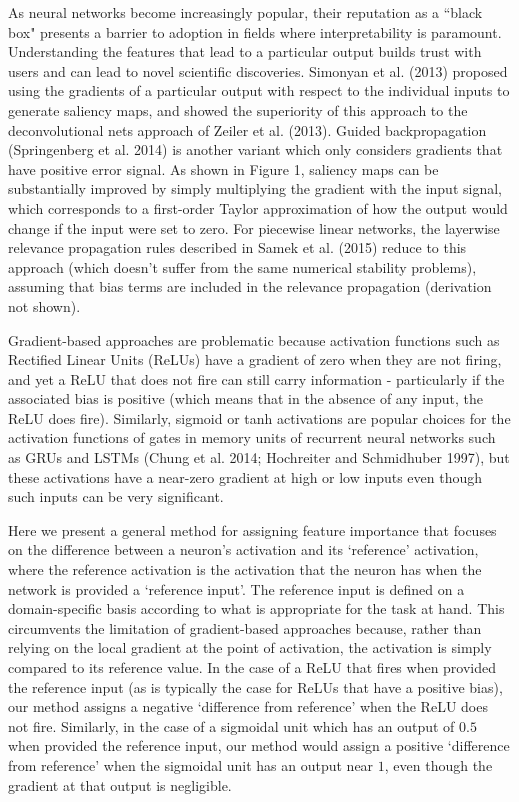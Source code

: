\documentclass{article}
\begin{document}
As neural networks become increasingly popular, their reputation as a ``black box" presents a barrier to adoption in fields where interpretability is paramount. Understanding the features that lead to a particular output builds trust with users and can lead to novel scientific discoveries. Simonyan et al. (2013) proposed using the gradients of a particular output with respect to the individual inputs to generate saliency maps, and showed the superiority of this approach to the deconvolutional nets approach of Zeiler et al. (2013). Guided backpropagation (Springenberg et al. 2014) is another variant which only considers gradients that have positive error signal. As shown in Figure 1, saliency maps can be substantially improved by simply multiplying the gradient with the input signal, which corresponds to a first-order Taylor approximation of how the output would change if the input were set to zero. For piecewise linear networks, the layerwise relevance propagation rules described in Samek et al. (2015) reduce to this approach (which doesn't suffer from the same numerical stability problems), assuming that bias terms are included in the relevance propagation (derivation not shown).

Gradient-based approaches are problematic because activation functions such as Rectified Linear Units (ReLUs) have a gradient of zero when they are not firing, and yet a ReLU that does not fire can still carry information - particularly if the associated bias is positive (which means that in the absence of any input, the ReLU does fire). Similarly, sigmoid or tanh activations are popular choices for the activation functions of gates in memory units of recurrent neural networks such as GRUs and LSTMs (Chung et al. 2014; Hochreiter and Schmidhuber 1997), but these activations have a near-zero gradient at high or low inputs even though such inputs can be very significant.

Here we present a general method for assigning feature importance that focuses on the difference between a neuron's activation and its `reference' activation, where the reference activation is the activation that the neuron has when the network is provided a `reference input'. The reference input is defined on a domain-specific basis according to what is appropriate for the task at hand. This circumvents the limitation of gradient-based approaches because, rather than relying on the local gradient at the point of activation, the activation is simply compared to its reference value. In the case of a ReLU that fires when provided the reference input (as is typically the case for ReLUs that have a positive bias), our method assigns a negative `difference from reference' when the ReLU does not fire. Similarly, in the case of a sigmoidal unit which has an output of $0.5$ when provided the reference input, our method would assign a positive `difference from reference' when the sigmoidal unit has an output near $1$, even though the gradient at that output is negligible.
\end{document}
